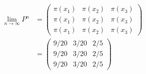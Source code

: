 \documentclass[11pt,letterpaper, leqno]{article}
\numberwithin{equation}{section}
\numberwithin{theorem}{section}
\numberwithin{lemma}{section}
\numberwithin{corollary}{section}
\numberwithin{definition}{section}
\numberwithin{proposition}{section}
\numberwithin{remark}{section}
\numberwithin{example}{section}
\begin{document}
\begin{enumerate}
\begin{enumerate}
                \begin{align*}
                    \lim_{n \to \infty} P^n &= \begin{pmatrix}
                        \pi(x_1) & \pi(x_2) & \pi(x_3)\\
                        \pi(x_1) & \pi(x_2) & \pi(x_3)\\
                        \pi(x_1) & \pi(x_2) & \pi(x_3)
                    \end{pmatrix}\\
                    &= \boxed{\begin{pmatrix}
                        9/20 & 3/20 & 2/5\\
                        9/20 & 3/20 & 2/5\\
                        9/20 & 3/20 & 2/5
                    \end{pmatrix}}
                \end{align*}

            \color{black}

    \end{enumerate}
\end{enumerate}
%

\end{document}
